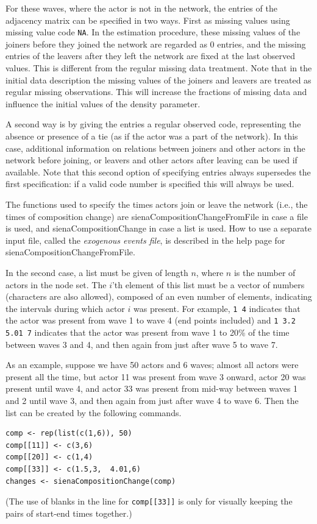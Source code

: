 \documentclass[a4paper,fleqn,11pt]{article}
\newcommand{\+}{\, + \,}
\newcommand{\sfn}[1]{\textsf{#1}}
\begin{document}
For these waves, where the actor is not in the network, the entries
of the adjacency matrix can be specified in two ways. First as
missing values using missing value code \texttt{NA}. In the estimation
procedure, these missing values of the joiners before they joined
the network are regarded as 0 entries, and the missing entries of
the leavers after they left the network are fixed at the last
observed values. This is different from the regular missing data
treatment. Note that in the initial data description the missing
values of the joiners and leavers are treated as regular missing
observations. This will increase the fractions of missing data and
influence the initial values of the density parameter.

A second way is by giving the entries a regular observed code,
representing the absence or presence of a tie (as
if the actor was a part of the network). In this case, additional
information on relations between joiners and other actors in the
network before joining, or leavers and other actors after leaving
can be used if available. Note that this second option of
specifying entries always supersedes the first specification: if a
valid code number is specified this will always be used.

The functions used to specify the times actors
join or leave the network (i.e., the times of composition change)
are \sfn{sienaCompositionChangeFromFile} in case a file is used,
and \sfn{sienaCompositionChange} in case a list is used.
How to use a separate input file,
called the \emph{exogenous events file}, is
described in the help page for \sfn{sienaCompositionChangeFromFile}.

In the second case, a list must be given of length $n$,
where $n$ is the number of actors in the node set.
The $i$'th element of this list must be a vector of numbers (characters are also allowed),
composed of an even number of elements, indicating the intervals during
which actor $i$ was present. For example, \texttt{1 4} indicates that the actor
was present from wave 1 to wave 4 (end points included) and
\texttt{1 3.2 5.01 7}
indicates that the actor was present from wave 1 to 20\% of the time between
waves 3 and 4, and then again from just after wave 5 to wave 7.

As an example, suppose we have 50 actors and 6 waves;
almost all actors were present all the time, but actor 11 was present
from wave 3 onward, actor 20 was present until wave 4, and
actor 33 was present from mid-way between waves 1 and 2 until wave 3, and then
again from just after wave 4 to wave 6.
Then the list can be created by the following commands.
\begin{verbatim}
comp <- rep(list(c(1,6)), 50)
comp[[11]] <- c(3,6)
comp[[20]] <- c(1,4)
comp[[33]] <- c(1.5,3,  4.01,6)
changes <- sienaCompositionChange(comp)
\end{verbatim}
(The use of blanks in the line for \texttt{comp[[33]]} is only for visually
keeping the pairs of start-end times together.)
\end{document}
